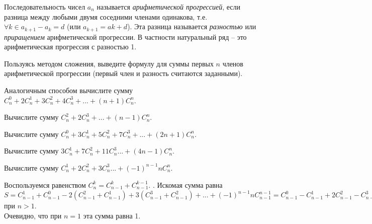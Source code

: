 \begin{dfn}
    Последовательность чисел ${a_n}$ называется \textit{арифметической прогрессией}, если разница между любыми двумя соседними членами одинакова, т.е. $\forall k \in a_{k+1} - a_k = d$ (или $a_{k + 1} = a{k} + d$). Эта разница называется \textit{разностью} или \textit{приращением} арифметической прогрессии. В частности натуральный ряд – это арифметическая прогрессия с разностью 1.
\end{dfn}

\begin{thm}
    Пользуясь методом сложения, выведите формулу для суммы первых $n$ членов арифметической прогрессии (первый член и разность считаются заданными).
\end{thm}

\begin{thm}
    Аналогичным способом вычислите сумму $C^0_n + 2 C^1_n + 3 C^2_n + 4 C^3_n + ... + (n + 1) C^n_n$.
\end{thm}

\begin{thm}
    Вычислите сумму $C^2_n + 2 C^3_n + ... + (n - 1) C^n_n$.
\end{thm}

\begin{thm}
    Вычислите сумму $C^0_n + 3 C^1_n + 5 C^2_n + 7 C^3_n + ... + (2n + 1) C^n_n$.
\end{thm}

\begin{thm}
    Вычислите сумму $3 C^1_n + 7 C^2_n + 11 C^3_n ... + (4n - 1) C^n_n$.
\end{thm}

\begin{thm}
    Вычислите сумму $C^1_n + 2 C^2_n + 3 C^3_n ... + (-1)^{n - 1} n C^n_n$.
\end{thm}

\begin{prf}
    Воспользуемся равенством $C^k_n = C^k_{n - 1} + C^{k - 1}_{n - 1}$. . Искомая сумма равна $S = C^1_{n - 1} + C^0_{n - 1} - 2 (C^2_{n - 1} + C^1_{n - 1}) + 3 (C^3_{n - 1} + C^2_{n - 1}) + ... + (-1)^{n - 1} n C^{n - 1}_{n - 1} = C^0_{n - 1} - C^1_{n - 1} + 2 C^2_{n - 1} - C^3_{n - 1} + ... + (-1)^{n - 1} C^{n - 1}_{n - 1} = 0$ при $n > 1$. 
    \\ Очевидно, что при $n = 1$ эта сумма равна 1.
\end{prf}

